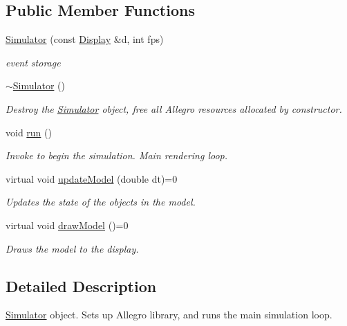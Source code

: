 \subsection*{Public Member Functions}
\begin{DoxyCompactItemize}
\item 
\mbox{\hyperlink{class_simulator_ac76c0369824f7d70f0d6cb98859d0b1d}{Simulator}} (const \mbox{\hyperlink{class_display}{Display}} \&d, int fps)
\begin{DoxyCompactList}\small\item\em event storage \end{DoxyCompactList}\item 
\mbox{\hyperlink{class_simulator_a0f49aa04f42060a785adf77346b9de9f}{$\sim$\+Simulator}} ()
\begin{DoxyCompactList}\small\item\em Destroy the \mbox{\hyperlink{class_simulator}{Simulator}} object, free all Allegro resources allocated by constructor. \end{DoxyCompactList}\item 
void \mbox{\hyperlink{class_simulator_aa2de7e32b04cc3e8fc60aec23997621b}{run}} ()
\begin{DoxyCompactList}\small\item\em Invoke to begin the simulation. Main rendering loop. \end{DoxyCompactList}\item 
virtual void \mbox{\hyperlink{class_simulator_a78e300570318b9cd65f52b9547dee070}{update\+Model}} (double dt)=0
\begin{DoxyCompactList}\small\item\em Updates the state of the objects in the model. \end{DoxyCompactList}\item 
virtual void \mbox{\hyperlink{class_simulator_ad47f95a2a5201a46f760c14d63d84725}{draw\+Model}} ()=0
\begin{DoxyCompactList}\small\item\em Draws the model to the display. \end{DoxyCompactList}\end{DoxyCompactItemize}


\subsection{Detailed Description}
\mbox{\hyperlink{class_simulator}{Simulator}} object. Sets up Allegro library, and runs the main simulation loop. 



